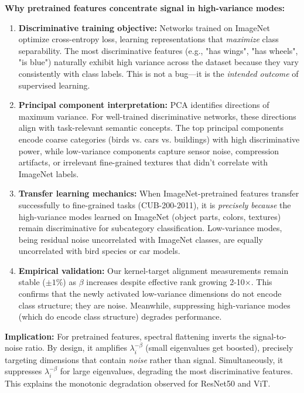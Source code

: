 \documentclass[11pt]{article}
\begin{document}
\textbf{Why pretrained features concentrate signal in high-variance modes:}
\begin{enumerate}
    \item \textbf{Discriminative training objective:} Networks trained on ImageNet optimize cross-entropy loss, learning representations that \emph{maximize} class separability. The most discriminative features (e.g., "has wings", "has wheels", "is blue") naturally exhibit high variance across the dataset because they vary consistently with class labels. This is not a bug---it is the \emph{intended outcome} of supervised learning.
    
    \item \textbf{Principal component interpretation:} PCA identifies directions of maximum variance. For well-trained discriminative networks, these directions align with task-relevant semantic concepts. The top principal components encode coarse categories (birds vs. cars vs. buildings) with high discriminative power, while low-variance components capture sensor noise, compression artifacts, or irrelevant fine-grained textures that didn't correlate with ImageNet labels.
    
    \item \textbf{Transfer learning mechanics:} When ImageNet-pretrained features transfer successfully to fine-grained tasks (CUB-200-2011), it is \emph{precisely because} the high-variance modes learned on ImageNet (object parts, colors, textures) remain discriminative for subcategory classification. Low-variance modes, being residual noise uncorrelated with ImageNet classes, are equally uncorrelated with bird species or car models.
    
    \item \textbf{Empirical validation:} Our kernel-target alignment measurements remain stable ($\pm 1\%$) as $\beta$ increases despite effective rank growing 2-10$\times$. This confirms that the newly activated low-variance dimensions do not encode class structure; they are noise. Meanwhile, suppressing high-variance modes (which do encode class structure) degrades performance.
\end{enumerate}

\textbf{Implication:} For pretrained features, spectral flattening inverts the signal-to-noise ratio. By design, it amplifies $\lambda_i^{-\beta}$ (small eigenvalues get boosted), precisely targeting dimensions that contain \emph{noise} rather than signal. Simultaneously, it suppresses $\lambda_i^{-\beta}$ for large eigenvalues, degrading the most discriminative features. This explains the monotonic degradation observed for ResNet50 and ViT.
\end{document}
